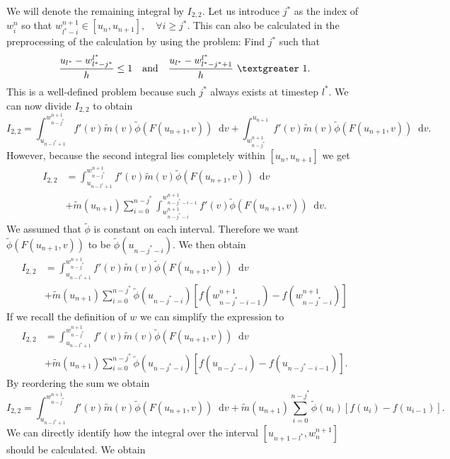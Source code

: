 \documentclass[12pt,a4paper,twoside, open=right]{scrreprt}
\theoremstyle{definition}
\theoremstyle{plain}
\newcommand{\g}{~\textgreater ~}
\newcommand{\D}{\mathop{}\!\mathrm{d}}
\begin{document}
We will denote the remaining integral by $I_{2,2}$. Let us introduce $j^*$ as the index of $w_i^{n}$ so that $w_{l^*-i}^{n+1}\in[u_n,u_{n+1}],\quad\forall i\ge j^*$. This can also be calculated in the preprocessing of the calculation by using the problem: Find $j^*$ such that
\begin{equation}
    \frac{u_{l^*}-w_{l^*-j^*}^{l^*}}{h}\le 1 \quad \text{and} \quad\frac{u_{l^*}-w_{l^*-j^*+1}^{l^*}}{h}\g 1.
\end{equation}
This is a well-defined problem because such $j^*$ always exists at timestep $l^*$. We can now divide $I_{2,2}$ to obtain
\begin{equation}
    I_{2,2}= \int_{u_{n-l^*+1}}^{w^{n+1}_{n-j^*}}f'(v)\tilde{m}(v)\tilde{\phi}(F(u_{n+1},v))\D v + \int_{w^{n+1}_{n-j^*}}^{u_{n+1}}f'(v)\tilde{m}(v)\tilde{\phi}(F(u_{n+1},v))\D v.
\end{equation}
However, because the second integral lies completely within $[u_n,u_{n+1}]$ we get 
\begin{align}
    I_{2,2}&=\int_{u_{n-l^*+1}}^{w^{n+1}_{n-j^*}}f'(v)\tilde{m}(v)\tilde{\phi}(F(u_{n+1},v))\D v \\&+\tilde{m}(u_{n+1})\sum_{i=0}^{n-j^*}\int_{w^{n+1}_{n-j^*-i}}^{w^{n+1}_{n-j^*-i-1}}f'(v)\tilde{\phi}(F(u_{n+1},v))\D v.
\end{align}
We assumed that $\tilde\phi$ is constant on each interval. Therefore we want $\tilde\phi(F(u_{n+1},v))$ to be $\tilde\phi(u_{n-j^*-i})$. We then obtain
\begin{align}
I_{2,2}&=\int_{u_{n-l^*+1}}^{w^{n+1}_{n-j^*}}f'(v)\tilde{m}(v)\tilde{\phi}(F(u_{n+1},v))\D v \\&+\tilde{m}(u_{n+1})\sum_{i=0}^{n-j^*}\tilde\phi(u_{n-j^*-i})[f(w^{n+1}_{n-j^*-i-1})-f(w_{n-j^*-i}^{n+1})]
\end{align}
If we recall the definition of $w$ we can simplify the expression to
\begin{align}
I_{2,2}&=\int_{u_{n-l^*+1}}^{w^{n+1}_{n-j^*}}f'(v)\tilde{m}(v)\tilde{\phi}(F(u_{n+1},v))\D v \\&+\tilde{m}(u_{n+1})\sum_{i=0}^{n-j^*}\tilde\phi(u_{n-j^*-i})[f(u_{n-j^*-i})-f(u_{n-j^*-i-1})].
\end{align}
By reordering the sum we obtain
\begin{equation}
    I_{2,2}=\int_{u_{n-l^*+1}}^{w^{n+1}_{n-j^*}}f'(v)\tilde{m}(v)\tilde{\phi}(F(u_{n+1},v))\D v +
    \tilde{m}(u_{n+1})\sum_{i=0}^{n-j^*}\tilde\phi(u_{i})[f(u_i)-f(u_{i-1})].
\end{equation}
We can directly identify how the integral over the interval $[u_{n+1-l^*},w^{n+1}_{n}]$ should be calculated. We obtain 
\end{document}
